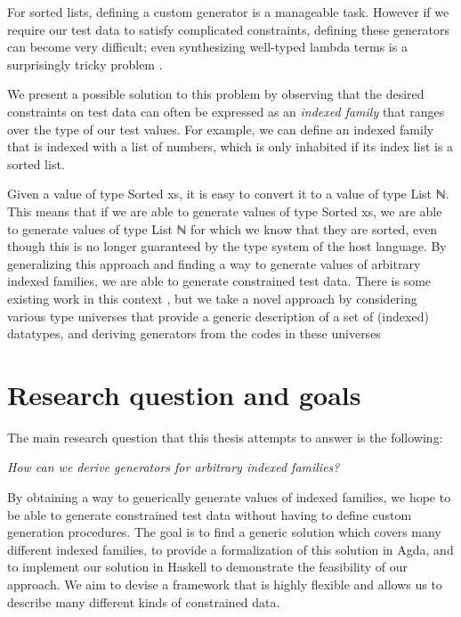 \documentclass[a4paper,msc,twosized=semi]{uustthesis}
\let\oldemph\emph
\renewcommand\emph[1]{{\large\oldemph{#1}}}
\newcommand{\agda}[1]{{\agdafontinline\color{agdacolor}#1}}
\newcommand{\includeagda}[2]{\vspace*{-0.25cm}\begin{center}{\fontsize{12}{14}\agdafont\ExecuteMetaData[../src/chap0#1/latex/code.tex]{#2}}\end{center}\vspace*{-0.25cm}}
\begin{document}
  For sorted lists, defining a custom generator is a manageable task. However if we 
  require our test data to satisfy complicated constraints, defining these 
  generators can become very difficult; even synthesizing well-typed lambda 
  terms is a surprisingly tricky problem \cite{palka2011testing, grygiel2013counting, 
  claessen2015generating}.

  We present a possible solution to this problem by observing that the desired 
  constraints on test data can often be expressed as an \emph{indexed family} that 
  ranges over the type of our test values. For example, we can define an indexed 
  family that is indexed with a list of numbers, which is only inhabited if its index 
  list is a sorted list.  

\includeagda{2}{sorted}

  Given a value of type \agda{Sorted xs}, it is easy to convert it to a value of type \agda{List 
  ℕ}. This means that if we are able to generate values of type \agda{Sorted xs}, we are 
  able to generate values of type \agda{List ℕ} for which we know that they are sorted, 
  even though this is no longer guaranteed by the type system of the host language. By 
  generalizing this approach and finding a way to generate values of arbitrary 
  indexed families, we are able to generate constrained test data. There is some 
  existing work in this context \cite{denes2014quickchick, magalhaes2011generic}, but
  we take a novel approach by considering various type universes that provide a 
  generic description of a set of (indexed) datatypes, and deriving generators from 
  the codes in these universes

\section{Research question and goals}

  The main research question that this thesis attempts to answer is the following: 
  \begin{center}
  \emph{
    How can we derive generators for arbitrary indexed families?
  } \end{center}
  By obtaining a way to generically generate values of indexed families, we hope to be 
  able to generate constrained test data without having to define custom generation 
  procedures. The goal is to find a generic solution which covers many different 
  indexed families, to provide a formalization of this solution in Agda, and to 
  implement our solution in Haskell to demonstrate the feasibility of our approach. We 
  aim to devise a framework that is highly flexible and allows us to describe many 
  different kinds of constrained data. 
\end{document}
